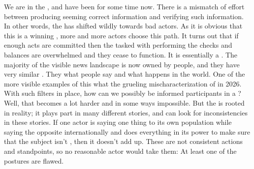 We are in the , and have been for some time now. There is a mismatch of effort between producing seeming correct information and verifying such information. In other words, the  has shifted wildly towards bad actors. As it is obvious that this is a winning , more and more actors choose this path. It turns out that if enough acts are committed then the  tasked with performing the checks and balances are overwhelmed and they cease to function. It is essentially a . The majority of the visible news landscape is now owned by  people, and they have very similar . They  what people say and what happens in the world. One of the more visible examples of this what the grueling mischaracterization of  in 2026\cite{dividedkingdom2026}. With such filters in place, how can we possibly be informed participants in a ? Well, that becomes a lot harder and in some ways impossible. But the  is rooted in reality; it plays part in many different stories, and can look for inconsistencies in these stories. If one actor is saying one thing to its own population while saying the opposite internationally and does everything in its power to make sure that the subject isn't , then it doesn't add up. These are not consistent actions and standpoints, so no reasonable actor would take them: At least one of the postures are flawed.

